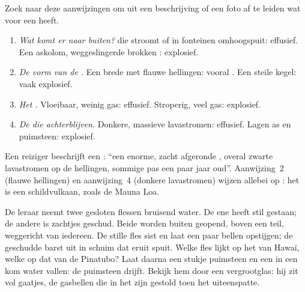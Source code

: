 \begin{method}\label{met:g7:volcanoes:clues}
Zoek naar deze aanwijzingen om uit een beschrijving of een foto af te leiden
wat voor  een  heeft.
\begin{enumerate}
  \item \emph{Wat komt er naar buiten?}  die stroomt of in fonteinen
        omhoogspuit: effusief. Een askolom, weggeslingerde brokken :
        explosief.
  \item \emph{De vorm van de .} Een brede  met flauwe hellingen:
        vooral . Een steile kegel: vaak explosief.
  \item \emph{Het .} Vloeibaar, weinig gas: effusief. Stroperig, veel
        gas: explosief.
  \item \emph{De  die achterblijven.} Donkere, massieve
        lavastromen: effusief. Lagen as en puimsteen: explosief.
\end{enumerate}
\end{method}

\begin{example}\label{ex:g7:volcanoes:clues}
Een reiziger beschrijft een : ``een enorme, zacht afgeronde ,
overal zwarte lavastromen op de hellingen, sommige pas een paar jaar
oud''. Aanwijzing~2 (flauwe hellingen) en aanwijzing~4 (donkere
lavastromen) wijzen allebei op : het is een
schildvulkaan, zoals de Mauna Loa.
\end{example}

\begin{inthelab}
De leraar neemt twee gesloten flessen bruisend water. De ene heeft stil
gestaan; de andere is zachtjes geschud. Beide worden buiten geopend, boven
een teil, weggericht van iedereen. De stille fles sist en laat een paar
bellen opstijgen; de geschudde barst uit in schuim dat eruit spuit. Welke
fles lijkt op het  van Hawaï, welke op dat van de Pinatubo? Laat
daarna een stukje puimsteen en een  in een kom water vallen: de
puimsteen drijft. Bekijk hem door een vergrootglas: hij zit vol gaatjes, de
gasbellen die in het  zijn gestold toen het  uiteenspatte.
\end{inthelab}

